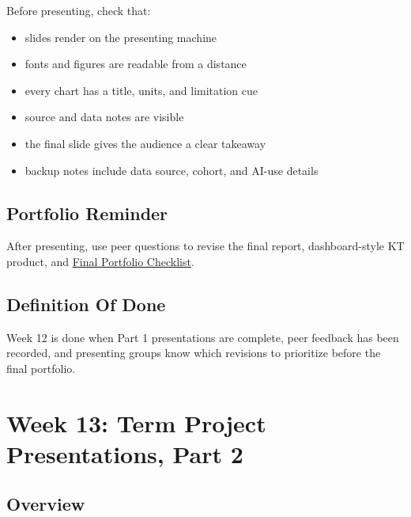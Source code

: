 \documentclass[
  letterpaper,
  DIV=11,
  numbers=noendperiod,
  oneside]{scrreprt}
\providecommand{\tightlist}{%
  \setlength{\itemsep}{0pt}\setlength{\parskip}{0pt}}
\begin{document}
Before presenting, check that:

\begin{itemize}
\tightlist
\item
  slides render on the presenting machine
\item
  fonts and figures are readable from a distance
\item
  every chart has a title, units, and limitation cue
\item
  source and data notes are visible
\item
  the final slide gives the audience a clear takeaway
\item
  backup notes include data source, cohort, and AI-use details
\end{itemize}

\section*{Portfolio Reminder}\label{portfolio-reminder}


After presenting, use peer questions to revise the final report,
dashboard-style KT product, and
\href{../../milestones/final-portfolio/final-portfolio-checklist.md}{Final
Portfolio Checklist}.

\section*{Definition Of Done}\label{definition-of-done-8}


Week 12 is done when Part 1 presentations are complete, peer feedback
has been recorded, and presenting groups know which revisions to
prioritize before the final portfolio.

\chapter*{Week 13: Term Project Presentations, Part
2}\label{week-13-term-project-presentations-part-2}


\section*{Overview}\label{overview-12}
\end{document}
